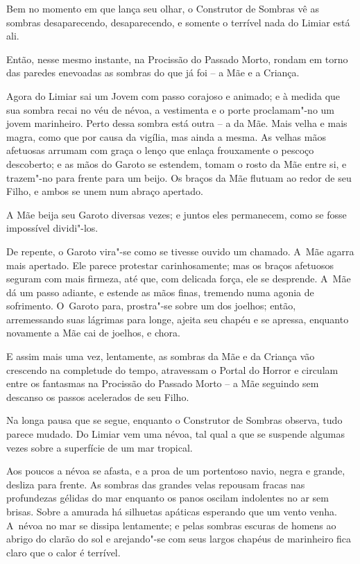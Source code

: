 Bem no momento em que lança seu olhar, o Construtor de Sombras vê as
sombras desaparecendo, desaparecendo, e somente o terrível nada do
Limiar está ali.

Então, nesse mesmo instante, na Procissão do Passado Morto, rondam em
torno das paredes enevoadas as sombras do que já foi -- a Mãe e a
Criança.

\smallskip
Agora do Limiar sai um Jovem com passo corajoso e animado; e à medida
que sua sombra recai no véu de névoa, a vestimenta e o porte
proclamam"-no um jovem marinheiro. Perto dessa sombra está outra -- a da
Mãe. Mais velha e mais magra, como que por causa da vigília, mas ainda a
mesma. As velhas mãos afetuosas arrumam com graça o lenço que enlaça
frouxamente o pescoço descoberto; e as mãos do Garoto se estendem, tomam o
rosto da Mãe entre si, e trazem"-no para frente para um beijo. Os braços
da Mãe flutuam ao redor de seu Filho, e ambos se unem num abraço
apertado.

A Mãe beija seu Garoto diversas vezes; e juntos eles permanecem, como se
fosse impossível dividi"-los.

De repente, o Garoto vira"-se como se tivesse ouvido um chamado. A~Mãe
agarra mais apertado. Ele parece protestar carinhosamente; mas os braços
afetuosos seguram com mais firmeza, até que, com delicada força, ele se
desprende. A~Mãe dá um passo adiante, e estende as mãos finas, tremendo
numa agonia de sofrimento. O~Garoto para, prostra"-se sobre um dos
joelhos; então, arremessando suas lágrimas para longe, ajeita seu chapéu
e se apressa, enquanto novamente a Mãe cai de joelhos, e chora.

E assim mais uma vez, lentamente, as sombras da Mãe e da Criança vão
crescendo na completude do tempo, atravessam o Portal do Horror e
circulam entre os fantasmas na Procissão do Passado Morto -- a Mãe
seguindo sem descanso os passos acelerados de seu Filho.

\smallskip
Na longa pausa que se segue, enquanto o Construtor de Sombras observa,
tudo parece mudado. Do Limiar vem uma névoa, tal qual a que se suspende
algumas vezes sobre a superfície de um mar tropical.

Aos poucos a névoa se afasta, e a proa de um portentoso navio, negra e
grande, desliza para frente. As sombras das grandes velas repousam
fracas nas profundezas gélidas do mar enquanto os panos oscilam
indolentes no ar sem brisas. Sobre a amurada há silhuetas apáticas
esperando que um vento venha. A~névoa no mar se dissipa lentamente; e
pelas sombras escuras de homens ao abrigo do clarão do sol e arejando"-se
com seus largos chapéus de marinheiro fica claro que o calor é terrível.

